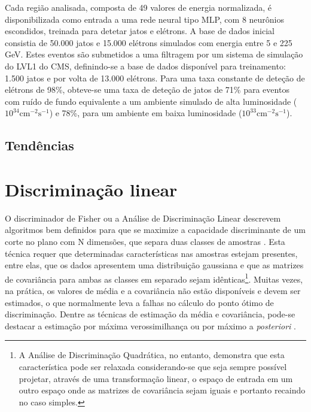 Cada região analisada, composta de 49 valores de energia normalizada, é
disponibilizada como entrada a uma rede neural tipo MLP, com 8 neurônios
escondidos, treinada para detetar jatos e elétrons. A base de dados inicial
consistia de 50.000 jatos e 15.000 elétrons simulados com energia entre 5 e
225 GeV. Estes eventos são submetidos a uma filtragem por um sistema de
simulação do LVL1 do CMS, definindo-se a base de dados disponível para
treinamento: 1.500 jatos e por volta de 13.000 elétrons. Para uma taxa
constante de deteção de elétrons de 98\%, obteve-se uma taxa de deteção de
jatos de 71\% para eventos com ruído de fundo equivalente a um ambiente
simulado de alta luminosidade ($10^{34}\text{cm}^{-2}\text{s}^{-1}$) e 78\%,
para um ambiente em baixa luminosidade ($10^{33}\text{cm}^{-2}\text{s}^{-1}$).

\subsection{Tendências}



\section{Discriminação linear}
\label{sec:lms}

O discriminador de Fisher \cite{fisher} ou a Análise de Discriminação Linear
descrevem algoritmos bem definidos para que se maximize a capacidade
discriminante de um corte no plano com N dimensões, que separa duas classes de
amostras \cite{duda}. Esta técnica requer que determinadas características nas
amostras estejam presentes, entre elas, que os dados apresentem uma
distribuição gaussiana e que as matrizes de covariância para ambas as classes
em separado sejam idênticas\footnote{A Análise de Discriminação Quadrática, no
entanto, demonstra que esta característica pode ser relaxada considerando-se
que seja sempre possível projetar, através de uma transformação linear, o
espaço de entrada em um outro espaço onde as matrizes de covariância sejam
iguais e portanto recaindo no caso simples.}. Muitas vezes, na prática, os
valores de média e a covariância não estão disponíveis e devem ser estimados,
o que normalmente leva a falhas no cálculo do ponto ótimo de
discriminação. Dentre as técnicas de estimação da média e covariância, pode-se
destacar a estimação por máxima verossimilhança ou por máximo a
\textit{posteriori} \cite{duda}.

